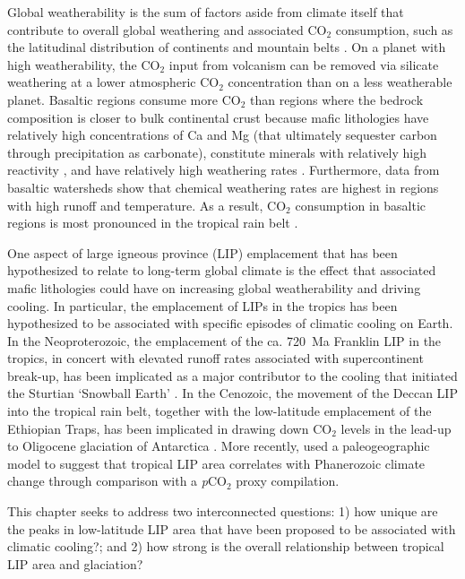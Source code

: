 \documentclass[11pt,letterpaper]{article}
\begin{document}
Global weatherability is the sum of factors aside from climate itself that contribute to overall global weathering and associated CO$_2$ consumption, such as the latitudinal distribution of continents and mountain belts \citep{Kump1997a}. On a planet with high weatherability, the CO$_2$ input from volcanism can be removed via silicate weathering at a lower atmospheric CO$_2$ concentration than on a less weatherable planet. Basaltic regions consume more CO$_2$ than regions where the bedrock composition is closer to bulk continental crust because mafic lithologies have relatively high concentrations of Ca and Mg (that ultimately sequester carbon through precipitation as carbonate), constitute minerals with relatively high reactivity \citep{Gislason2003a}, and have relatively high weathering rates \citep{Dessert2003a, Ibarra2016a}. Furthermore, data from basaltic watersheds show that chemical weathering rates are highest in regions with high runoff and temperature. As a result, CO$_2$ consumption in basaltic regions is most pronounced in the tropical rain belt \citep{Dessert2003a, Hartmann2009a, Hartmann2014a}.

One aspect of large igneous province (LIP) emplacement that has been hypothesized to relate to long-term global climate is the effect that associated mafic lithologies could have on increasing global weatherability and driving cooling. In particular, the emplacement of LIPs in the tropics has been hypothesized to be associated with specific episodes of climatic cooling on Earth. In the Neoproterozoic, the emplacement of the ca. 720~Ma Franklin LIP in the tropics, in concert with elevated runoff rates associated with supercontinent break-up, has been implicated as a major contributor to the cooling that initiated the Sturtian `Snowball Earth' \citep{Donnadieu2004b, Macdonald2010a, Cox2016a}. In the Cenozoic, the movement of the Deccan LIP into the tropical rain belt, together with the low-latitude emplacement of the Ethiopian Traps, has been implicated in drawing down CO$_2$ levels in the lead-up to Oligocene glaciation of Antarctica \citep{Kent2008a, Kent2013a}. More recently, \citet{Johansson2018a} used a paleogeographic model to suggest that tropical LIP area correlates with Phanerozoic climate change through comparison with a \textit{p}CO$_{2}$ proxy compilation.

This chapter seeks to address two interconnected questions: 1) how unique are the peaks in low-latitude LIP area that have been proposed to be associated with climatic cooling?; and 2) how strong is the overall relationship between tropical LIP area and glaciation?
\end{document}
